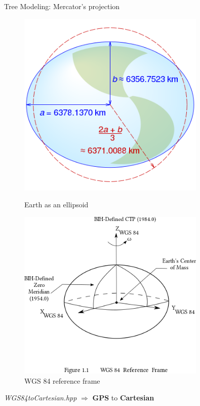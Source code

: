 \documentclass[10pt]{beamer}
\begin{document}
  \begin{frame}{Tree Modeling: Mercator's projection}
	\Large
	\begin{figure}[H]
	  \centering
	  \begin{minipage}{0.49\textwidth}
		  \centering
		  \includegraphics[width=0.8\textwidth]{images/WGS84-earth-radius.png}
		  \caption{Earth as an ellipsoid\cite{mercator-proj}}
	  \end{minipage}\hfill
	  \begin{minipage}{0.49\textwidth}
		  \centering
		  \includegraphics[width=0.8\textwidth]{images/WGS84-frame.png}
		  \caption{WGS 84 reference frame\cite{mercator-proj}}
	  \end{minipage}
  \end{figure}

  \textit{WGS84toCartesian.hpp} $\Longrightarrow$ \textbf{GPS} to \textbf{Cartesian}
  \end{frame}
\end{document}
